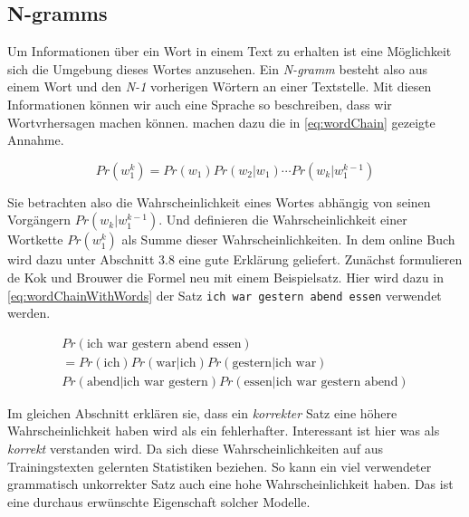 \subsection{N-gramms}
    \label{sec:n-gramms}
    
    Um Informationen über ein Wort in einem Text zu erhalten ist eine Möglichkeit sich die Umgebung dieses Wortes anzusehen. Ein \emph{N-gramm} besteht also aus einem Wort und den \emph{N-1} vorherigen Wörtern an einer Textstelle. Mit diesen Informationen können wir auch eine Sprache so beschreiben, dass wir Wortvrhersagen machen können. \parencite[S. 468, Gleichung 1]{cumpatationalLinguistics:classBasedNGramms} machen dazu die in \autoref{eq:wordChain} gezeigte Annahme.
        
    \begin{equation}
       	Pr(w_1^k) = Pr(w_1) Pr(w_2|w_1) \cdots Pr(w_k|w_1^{k-1})
       	\label{eq:wordChain}
    \end{equation}
       
    Sie betrachten also die Wahrscheinlichkeit eines Wortes abhängig von seinen Vorgängern \(Pr(w_k|w_1^{k-1})\). Und definieren die Wahrscheinlichkeit einer Wortkette \(Pr(w_1^k)\) als Summe dieser Wahrscheinlichkeiten. In dem online Buch \parencite{nlwp:book} wird dazu unter Abschnitt 3.8 eine gute Erklärung geliefert. Zunächst formulieren de Kok und Brouwer die Formel neu mit einem Beispielsatz. Hier wird dazu in \autoref{eq:wordChainWithWords} der Satz \texttt{ich war gestern abend essen} verwendet werden.
        
    \begin{equation}
       	\begin{split}
       		Pr(\text{ich war gestern abend essen}) \\
            = Pr(\text{ich}) Pr(\text{war}|\text{ich}) Pr(\text{gestern}|\text{ich war}) \\
            Pr(\text{abend}|\text{ich war gestern}) Pr(\text{essen}|\text{ich war gestern abend}) 
        \end{split}
        \label{eq:wordChainWithWords}
    \end{equation}
        
    Im gleichen Abschnitt erklären sie, dass ein \emph{korrekter} Satz eine höhere Wahrscheinlichkeit haben wird als ein fehlerhafter. Interessant ist hier was als \emph{korrekt} verstanden wird. Da sich diese Wahrscheinlichkeiten auf aus Trainingstexten gelernten Statistiken beziehen. So kann ein viel verwendeter grammatisch unkorrekter Satz auch eine hohe Wahrscheinlichkeit haben. Das ist eine durchaus erwünschte Eigenschaft solcher Modelle.
        
